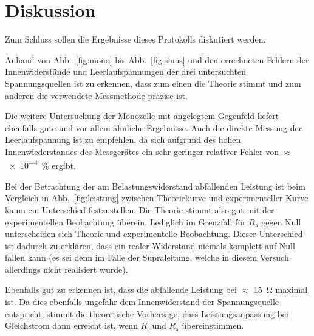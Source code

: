 
\section{Diskussion}
Zum Schluss sollen die Ergebnisse dieses Protokolls diskutiert werden.

Anhand von Abb.~\ref{fig:mono} bis Abb.~\ref{fig:sinus} und den 
errechneten Fehlern der 
Innenwiderstände und Leerlaufspannungen der drei untersuchten 
Spannungsquellen ist zu erkennen, dass zum einen die Theorie stimmt und 
zum anderen die verwendete Messmethode präzise ist.

Die weitere Untersuchung der Monozelle mit angelegtem Gegenfeld liefert 
ebenfalls gute und vor allem ähnliche Ergebnisse. 
Auch die direkte Messung der Leerlaufspannung ist zu empfehlen, da 
sich aufgrund des hohen Innenwiederstandes des Messgerätes ein
sehr geringer relativer Fehler von $\approx$ \SI{e-4}{\percent} 
ergibt.

Bei der Betrachtung der am Belastungswiderstand abfallenden Leistung 
ist beim Vergleich in Abb.~\ref{fig:leistung} zwischen Theoriekurve und 
experimenteller Kurve kaum ein Unterschied festzustellen. Die Theorie 
stimmt also gut mit der experimentellen Beobachtung überein. Lediglich 
im Grenzfall für $R_\text{a}$ gegen Null unterscheiden sich Theorie und 
experimentelle Beobachtung. Dieser Unterschied ist dadurch zu erklären, 
dass ein realer Widerstand niemals komplett auf Null fallen kann (es sei 
denn im Falle der Supraleitung, welche in diesem Versuch allerdings nicht 
realisiert wurde).

Ebenfalls gut zu erkennen ist, dass die abfallende Leistung bei $\approx$ 
\SI{15}{\ohm} maximal ist. Da dies ebenfalls ungefähr dem Innenwiderstand 
der Spannungsquelle entspricht, stimmt die theoretische Vorhersage, dass 
Leistungsanpassung bei Gleichstrom dann erreicht ist, wenn $R_\text{i}$ 
und $R_\text{a}$ übereinstimmen.